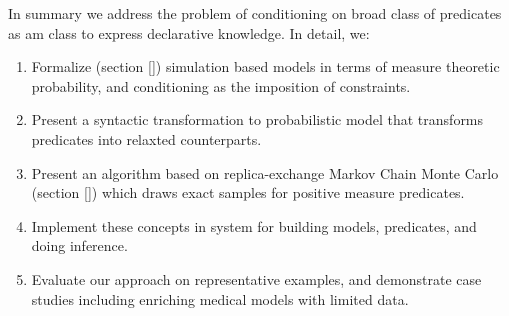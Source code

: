 In summary we address the problem of conditioning on broad class of predicates as am class to express declarative knowledge.
In detail, we:

\begin{enumerate}
	\item Formalize (section \ref{}) simulation based models in terms of measure theoretic probability, and conditioning as the imposition of constraints.
	\item Present a syntactic transformation to probabilistic model that transforms predicates into relaxted counterparts. 
	\item Present an algorithm based on replica-exchange Markov Chain Monte Carlo (section \ref{}) which draws exact samples for positive measure predicates. 
	\item Implement these concepts in system for building models, predicates, and doing inference.
	\item Evaluate our approach on representative examples, and demonstrate case studies including enriching medical models with limited data.
\end{enumerate}



